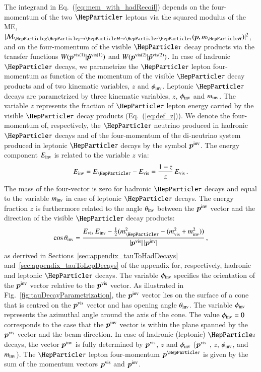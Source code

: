 The integrand in Eq.~(\ref{eq:mem_with_hadRecoil}) depends on the
four-momentum of the two $\Pgt$ leptons via the squared modulus of the
ME, $\vert \mathcal{M}_{\Pg\Pg \to \PHiggs \to \Pgt\Pgt}(\bm{p},m_{\PHiggs}) \vert^{2}$,
and on the four-momentum of the visible $\Pgt$ decay products via the
transfer functions $W( \bm{p}^{\textrm{vis}(1)} | \bm{\hat{p}}^{\textrm{vis}(1)} )$ and $W( \bm{p}^{\textrm{vis}(2)} | \bm{\hat{p}}^{\textrm{vis}(2)} )$.
In case of hadronic $\Pgt$ decays, 
we parametrize the $\Pgt$ lepton four-momentum as function of the momentum of the visible $\Pgt$ decay products and of two kinematic variables,
$z$ and $\phi_{\textrm{inv}}$.
Leptonic $\Pgt$ decays are parametrized by three kinematic variables, $z$, $\phi_{\textrm{inv}}$ and $m_{\textrm{inv}}$.
The variable $z$ represents the fraction of $\Pgt$ lepton energy
carried by the visible $\Pgt$ decay products (\cf Eq.~(\ref{eq:def_z})).
We denote the four-momentum of, respectively, the $\Pgt$ neutrino
produced in hadronic $\Pgt$ decays and of the
four-momentum of the di-neutrino system produced in leptonic $\Pgt$
decays by the symbol $\bm{p}^{\textrm{inv}}$.
The energy component $E_{\textrm{inv}}$ is related to the variable $z$ via:
\begin{equation}
E_{\inv} = E_{\Pgt} - E_{\vis} = \frac{1 - z}{z} \, E_{\vis} \, .
\label{eq:E_inv}
\end{equation}
The mass of the four-vector is zero for hadronic $\Pgt$ decays and
equal to the variable $m_{\textrm{inv}}$ in case of leptonic $\Pgt$ decays.
The energy fraction $z$ is furthermore related to the angle $\theta_{\textrm{inv}}$ between the $\bm{p}^{\textrm{inv}}$ vector and the direction of the visible $\Pgt$ decay products:
\begin{equation}
\cos\theta_{\inv} = \frac{E_{\vis} \, E_{\inv} - \frac{1}{2}(m^{2}_{\Pgt} - (m^{2}_{\vis} + m^{2}_{\inv}))}{\vert\bm{p^{\vis}}\vert \, \vert\bm{p^{\inv}}\vert} \, ,
\label{eq:theta_inv}
\end{equation}
as derrived in Sections~\ref{sec:appendix_tauToHadDecays}
and~\ref{sec:appendix_tauToLepDecays} of the appendix for,
respectively, hadronic and leptonic $\Pgt$ decays.
The variable $\phi_{\textrm{inv}}$ specifies the orientation of the
$\bm{p}^{\textrm{inv}}$ vector relative to the $\bm{p}^{\textrm{vis}}$ vector.
As illustrated in Fig.~\ref{fig:tauDecayParametrization}, the
$\bm{p}^{\textrm{inv}}$ vector lies on the surface of a cone that is centred
on the $\bm{p}^{\textrm{vis}}$ vector and has opening angle $\theta_{\textrm{inv}}$.
The variable $\phi_{\textrm{inv}}$ represents the azimuthal angle around the
axis of the cone.
The value $\phi_{\textrm{inv}} = 0$ corresponds to the case that the $\bm{p}^{\textrm{inv}}$ vector is within the plane spanned by the $\bm{p}^{\textrm{vis}}$ vector and the beam direction.
In case of hadronic (leptonic) $\Pgt$ decays, the vector $\bm{p}^{\textrm{inv}}$ is fully
determined by $\bm{p}^{\textrm{vis}}$, $z$ and $\phi_{\textrm{inv}}$ ($\bm{p}^{\textrm{vis}}$
, $z$, $\phi_{\textrm{inv}}$, and $m_{\textrm{inv}}$).
The $\Pgt$ lepton four-momentum $\bm{p}^{\Pgt}$ is given by the sum of
the momentum vectors $\bm{p}^{\textrm{vis}}$ and $\bm{p}^{\textrm{inv}}$.

